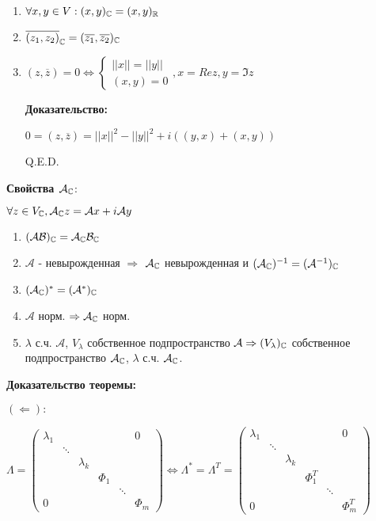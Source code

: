 \begin{enumerate}
    \item $\forall x,y \in V: (x,y)_{\mathbb{C}} = (x,y)_{\mathbb{R}}$
    \item $\overline{(z_1,z_2)}_{\mathbb{C}} = (\overline{z_1},\overline{z_2})_{\mathbb{C}}$
    \item $(z,\overline{z}) = 0 \Leftrightarrow \begin{cases}
        ||x|| =||y|| \\
        (x,y) = 0
    \end{cases}, x = Re z, y = \Im z$

    \textbf{Доказательство:}

    $0 = (z,\overline{z})= ||x||^2 -||y||^2 + i((y,x) + (x,y))$

    \hfill Q.E.D.
\end{enumerate}




\textbf{Свойства $\mathcal{A}_{\mathbb{C}}$}:

$\forall z \in V_{\mathbb{C}}, \mathcal{A}_{\mathbb{C}} z=\mathcal{A}x + i \mathcal{A}y$

\begin{enumerate}
    \item $(\mathcal{A}\mathcal{B})_{\mathbb{C}} = \mathcal{A}_{\mathbb{C}} \mathcal{B}_{\mathbb{C}}$
    \item $\mathcal{A}$ -  невырожденная $\Rightarrow$ $\mathcal{A}_{\mathbb{C}}$ невырожденная и $(\mathcal{A}_{\mathbb{C}})^{-1} = (\mathcal{A}^{-1})_{\mathbb{C}}$
    \item $(\mathcal{A}_{\mathbb{C}})^* = (\mathcal{A}^*)_{\mathbb{C}}$

    \item $\mathcal{A}$ норм. $\Rightarrow \mathcal{A}_{\mathbb{C}}$ норм.
    \item $\lambda$ с.ч. $\mathcal{A}$, $V_{\lambda}$ собственное подпространство $\mathcal{A} \Rightarrow (V_{\lambda})_{\mathbb{C}}$ собственное подпространство $\mathcal{A}_{\mathbb{C}}$, $\lambda$ с.ч. $\mathcal{A}_{\mathbb{C}}$.
\end{enumerate}

\textbf{Доказательство теоремы:}

 $(\Leftarrow):$

$\Lambda = \begin{pmatrix}
    \lambda_1 & & & & &0\\
    & \ddots & & & &\\
    & & \lambda_k & & &\\
    & & & \Phi_1 & &\\
    & & & & \ddots & \\
    0& & & & & \Phi_m
\end{pmatrix} \Leftrightarrow\Lambda^* = \Lambda^T = \begin{pmatrix}
    \lambda_1 & & & & &0\\
    & \ddots & & & &\\
    & & \lambda_k & & &\\
    & & & \Phi_1^T & &\\
    & & & & \ddots & \\
    0& & & & & \Phi_m^T
\end{pmatrix}$

